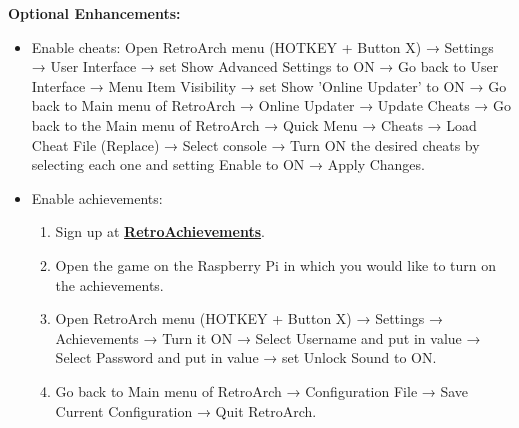 \vspace{0.5cm}

\noindent \textbf{Optional Enhancements:}
\begin{itemize}

\item Enable cheats: Open RetroArch menu (HOTKEY + Button X) → Settings → User Interface → set Show Advanced Settings to ON → Go back to User Interface → Menu Item Visibility → set Show 'Online Updater' to ON → Go back to Main menu of RetroArch → Online Updater → Update Cheats → Go back to the Main menu of RetroArch → Quick Menu → Cheats → Load Cheat File (Replace) → Select console → Turn ON the desired cheats by selecting each one and setting Enable to ON → Apply Changes.

\item Enable achievements:
\begin{enumerate}
\item Sign up at \href{https://retroachievements.org}{\textbf{\color{blue}RetroAchievements}}.
\item Open the game on the Raspberry Pi in which you would like to turn on the achievements.
\item Open RetroArch menu (HOTKEY + Button X) → Settings → Achievements → Turn it ON → Select Username and put in value → Select Password and put in value → set Unlock Sound to ON.
\item Go back to Main menu of RetroArch → Configuration File → Save Current Configuration → Quit RetroArch.
\end{enumerate}

\end{itemize}
